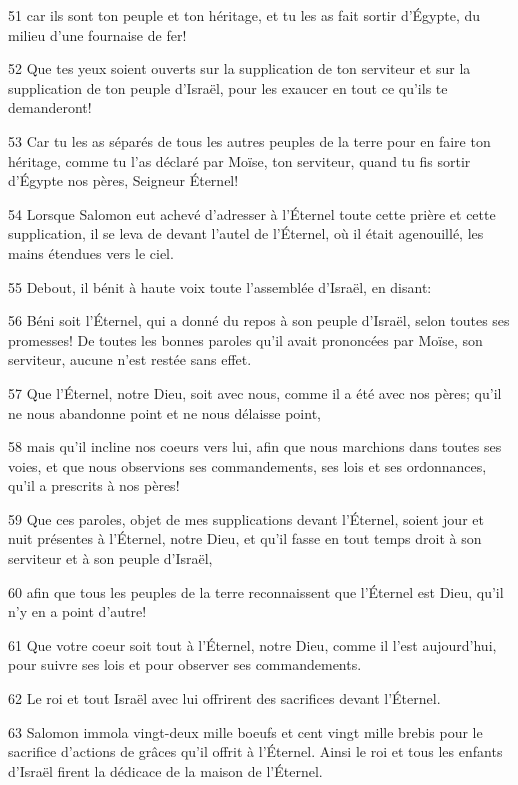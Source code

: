 \par 51 car ils sont ton peuple et ton héritage, et tu les as fait sortir d'Égypte, du milieu d'une fournaise de fer!
\par 52 Que tes yeux soient ouverts sur la supplication de ton serviteur et sur la supplication de ton peuple d'Israël, pour les exaucer en tout ce qu'ils te demanderont!
\par 53 Car tu les as séparés de tous les autres peuples de la terre pour en faire ton héritage, comme tu l'as déclaré par Moïse, ton serviteur, quand tu fis sortir d'Égypte nos pères, Seigneur Éternel!
\par 54 Lorsque Salomon eut achevé d'adresser à l'Éternel toute cette prière et cette supplication, il se leva de devant l'autel de l'Éternel, où il était agenouillé, les mains étendues vers le ciel.
\par 55 Debout, il bénit à haute voix toute l'assemblée d'Israël, en disant:
\par 56 Béni soit l'Éternel, qui a donné du repos à son peuple d'Israël, selon toutes ses promesses! De toutes les bonnes paroles qu'il avait prononcées par Moïse, son serviteur, aucune n'est restée sans effet.
\par 57 Que l'Éternel, notre Dieu, soit avec nous, comme il a été avec nos pères; qu'il ne nous abandonne point et ne nous délaisse point,
\par 58 mais qu'il incline nos coeurs vers lui, afin que nous marchions dans toutes ses voies, et que nous observions ses commandements, ses lois et ses ordonnances, qu'il a prescrits à nos pères!
\par 59 Que ces paroles, objet de mes supplications devant l'Éternel, soient jour et nuit présentes à l'Éternel, notre Dieu, et qu'il fasse en tout temps droit à son serviteur et à son peuple d'Israël,
\par 60 afin que tous les peuples de la terre reconnaissent que l'Éternel est Dieu, qu'il n'y en a point d'autre!
\par 61 Que votre coeur soit tout à l'Éternel, notre Dieu, comme il l'est aujourd'hui, pour suivre ses lois et pour observer ses commandements.
\par 62 Le roi et tout Israël avec lui offrirent des sacrifices devant l'Éternel.
\par 63 Salomon immola vingt-deux mille boeufs et cent vingt mille brebis pour le sacrifice d'actions de grâces qu'il offrit à l'Éternel. Ainsi le roi et tous les enfants d'Israël firent la dédicace de la maison de l'Éternel.
